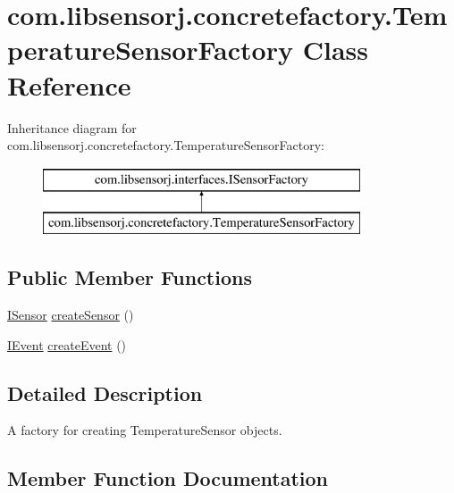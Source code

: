 \hypertarget{classcom_1_1libsensorj_1_1concretefactory_1_1TemperatureSensorFactory}{}\section{com.\+libsensorj.\+concretefactory.\+Temperature\+Sensor\+Factory Class Reference}
\label{classcom_1_1libsensorj_1_1concretefactory_1_1TemperatureSensorFactory}
Inheritance diagram for com.\+libsensorj.\+concretefactory.\+Temperature\+Sensor\+Factory\+:\begin{figure}[H]
\begin{center}
\leavevmode
\includegraphics[height=2.000000cm]{classcom_1_1libsensorj_1_1concretefactory_1_1TemperatureSensorFactory}
\end{center}
\end{figure}
\subsection*{Public Member Functions}
\begin{DoxyCompactItemize}
\item 
\hyperlink{interfacecom_1_1libsensorj_1_1interfaces_1_1ISensor}{I\+Sensor} \hyperlink{classcom_1_1libsensorj_1_1concretefactory_1_1TemperatureSensorFactory_aeba8598ebe5c182154f63e0c94abdd70}{create\+Sensor} ()
\item 
\hyperlink{classcom_1_1libsensorj_1_1interfaces_1_1IEvent}{I\+Event} \hyperlink{classcom_1_1libsensorj_1_1concretefactory_1_1TemperatureSensorFactory_adb3d5716b5e55f4fc037c0a95ec99688}{create\+Event} ()
\end{DoxyCompactItemize}


\subsection{Detailed Description}
A factory for creating Temperature\+Sensor objects. 

\subsection{Member Function Documentation}
\hypertarget{classcom_1_1libsensorj_1_1concretefactory_1_1TemperatureSensorFactory_adb3d5716b5e55f4fc037c0a95ec99688}{}
